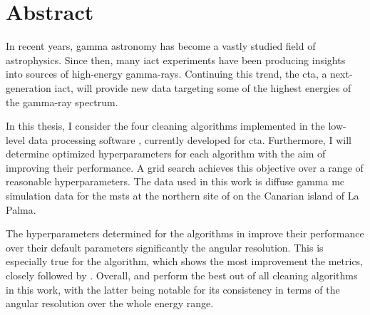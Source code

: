 \thispagestyle{plain}

\section*{Abstract}
In recent years, gamma astronomy has become a vastly studied field of astrophysics.
Since then, many \gls{iact} experiments have been producing insights into sources of
high-energy gamma-rays. Continuing this trend, the \gls{cta}, a next-generation \gls{iact},
will provide new data targeting some of the highest energies of the gamma-ray spectrum.

In this thesis, I consider the four cleaning algorithms implemented in the low-level data processing software \ctapipe{},
currently developed for \gls{cta}. Furthermore, I will determine optimized hyperparameters for each algorithm
with the aim of improving their performance. A grid search achieves this objective
over a range of reasonable hyperparameters. The data used in this work is diffuse gamma \gls{mc} simulation data for
the \glspl{mst} at the northern site of \cta{} on the Canarian island of La Palma.

The hyperparameters determined for the algorithms in \ctapipe{} improve their performance over
their default parameters significantly \wrt the angular resolution. This is especially true for the
\tcc{} algorithm, which shows the most improvement \wrt the metrics, closely followed by \mars{}.
Overall, \fact{} and \mars{} perform the best out of all cleaning algorithms in this work,
with the latter being notable for its consistency in terms of the angular resolution over the whole energy range.



